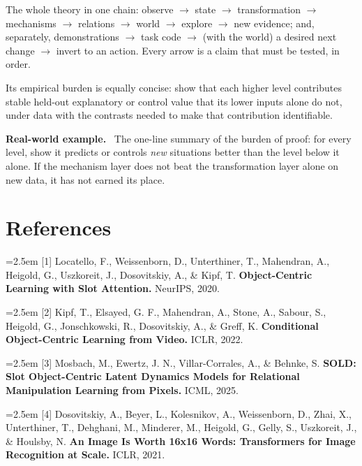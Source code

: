 \documentclass[11pt]{article}
\newenvironment{plainword}{%
  \par\medskip\noindent\begin{minipage}{\textwidth}%
  \color{gray!75!black}\small\itshape
}{%
  \end{minipage}\par\medskip}
\newenvironment{example}{%
  \par\smallskip\noindent\begin{minipage}{\textwidth}%
  \color{teal!60!black}\small
  \textbf{\color{teal!70!black}Real-world example.}\
}{%
  \end{minipage}\par\smallskip}
\begin{document}
\begin{plainword}
The whole theory in one chain: observe $\to$ state $\to$ transformation $\to$ mechanisms $\to$ relations $\to$ world $\to$ explore
$\to$ new evidence; and, separately, demonstrations $\to$ task code $\to$ (with the world) a desired next change $\to$ invert to an
action. Every arrow is a claim that must be tested, in order.
\end{plainword}

Its empirical burden is equally concise: show that each higher level contributes stable held-out explanatory or control value that
its lower inputs alone do not, under data with the contrasts needed to make that contribution identifiable.

\begin{example}
The one-line summary of the burden of proof: for every level, show it predicts or controls \emph{new} situations better than the level
below it alone. If the mechanism layer does not beat the transformation layer alone on new data, it has not earned its place.
\end{example}

\section*{References}

\noindent\hangindent=2.5em [1] Locatello, F., Weissenborn, D., Unterthiner, T., Mahendran, A., Heigold, G., Uszkoreit, J., Dosovitskiy, A., \& Kipf, T. \textbf{Object-Centric Learning with Slot Attention.} NeurIPS, 2020.\par

\noindent\hangindent=2.5em [2] Kipf, T., Elsayed, G. F., Mahendran, A., Stone, A., Sabour, S., Heigold, G., Jonschkowski, R., Dosovitskiy, A., \& Greff, K. \textbf{Conditional Object-Centric Learning from Video.} ICLR, 2022.\par

\noindent\hangindent=2.5em [3] Mosbach, M., Ewertz, J. N., Villar-Corrales, A., \& Behnke, S. \textbf{SOLD: Slot Object-Centric Latent Dynamics Models for Relational Manipulation Learning from Pixels.} ICML, 2025.\par

\noindent\hangindent=2.5em [4] Dosovitskiy, A., Beyer, L., Kolesnikov, A., Weissenborn, D., Zhai, X., Unterthiner, T., Dehghani, M., Minderer, M., Heigold, G., Gelly, S., Uszkoreit, J., \& Houlsby, N. \textbf{An Image Is Worth 16x16 Words: Transformers for Image Recognition at Scale.} ICLR, 2021.\par
\end{document}
